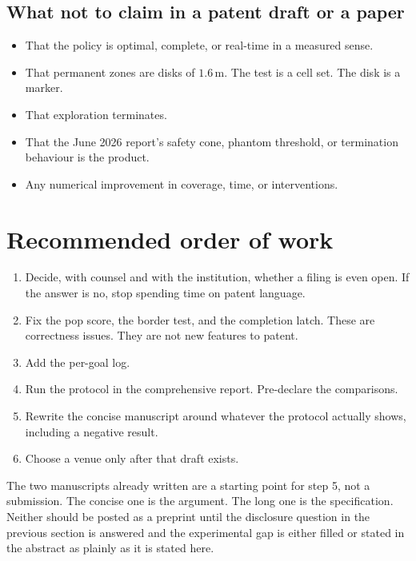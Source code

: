 \documentclass[11pt]{article}
\begin{document}
\subsection{What not to claim in a patent draft or a paper}
\begin{itemize}
\item That the policy is optimal, complete, or real-time in a measured sense.
\item That permanent zones are disks of $1.6$\,m. The test is a cell set. The disk is a marker.
\item That exploration terminates.
\item That the June 2026 report's safety cone, phantom threshold, or termination behaviour is the product.
\item Any numerical improvement in coverage, time, or interventions.
\end{itemize}

\section{Recommended order of work}
\begin{enumerate}
\item Decide, with counsel and with the institution, whether a filing is even open. If the answer is no, stop spending time on patent language.
\item Fix the pop score, the border test, and the completion latch. These are correctness issues. They are not new features to patent.
\item Add the per-goal log.
\item Run the protocol in the comprehensive report. Pre-declare the comparisons.
\item Rewrite the concise manuscript around whatever the protocol actually shows, including a negative result.
\item Choose a venue only after that draft exists.
\end{enumerate}

The two manuscripts already written are a starting point for step 5, not a submission. The concise one is the argument. The long one is the specification. Neither should be posted as a preprint until the disclosure question in the previous section is answered and the experimental gap is either filled or stated in the abstract as plainly as it is stated here.
\end{document}
